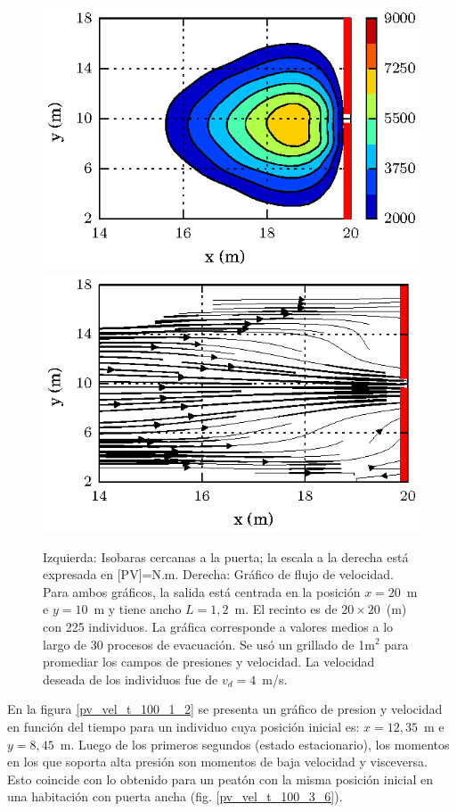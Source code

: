 \begin{figure}[H]
    \centering
    \includegraphics[scale=1]{figuras/fig4_version0.eps}
        \includegraphics[scale=1]{figuras/flujo_door_1_2m.eps}
    \caption[width=5cm]{Izquierda: Isobaras cercanas a la puerta; la escala a la derecha está expresada en [PV]=N.m. Derecha: Gráfico de flujo de velocidad. Para ambos gráficos, la salida está centrada en la posición $x=20$~m e $y=10$~m y tiene ancho $L=1,2$~m. El recinto es de $20\times 20$~(m) con 225 individuos. La gráfica corresponde a valores medios a lo largo de 30 procesos de evacuación. Se usó un grillado de 1m$^2$ para promediar los campos de presiones y velocidad. La velocidad deseada de los individuos fue de $v_d=4$~m/s.}
    \label{isobaras_flujo_1_2m}
\end{figure}
En la figura \ref{pv_vel_t_100_1_2} se presenta un gráfico de presion y velocidad en función del tiempo para un individuo cuya posición inicial es: $x=12,35$~m e $y=8,45$~m. Luego de los primeros segundos (estado estacionario), los momentos en los que soporta alta presión son momentos de baja velocidad y visceversa. Esto coincide con lo obtenido para un peatón con la misma posición inicial en una habitación con puerta ancha (fig. \ref{pv_vel_t_100_3_6}). \\
